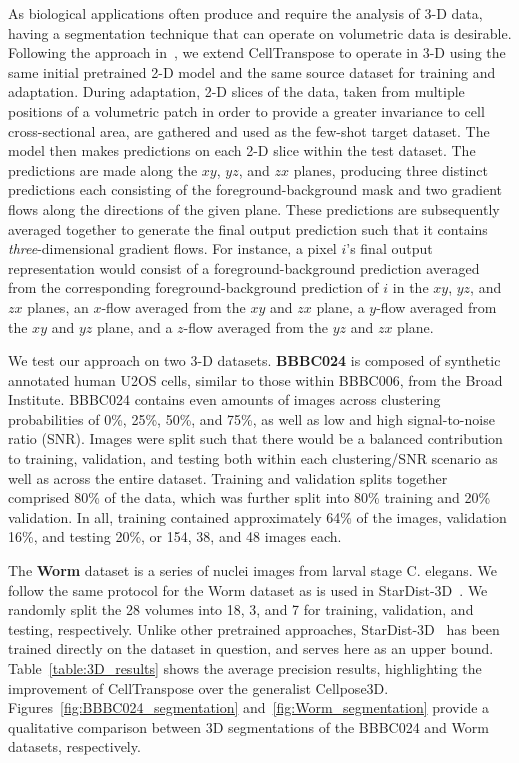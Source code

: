 As biological applications often produce and require the analysis of 3-D data, having a segmentation technique that can operate on volumetric data is desirable. Following the approach in~\cite{Stringer2021-yw}, we extend CellTranspose to operate in 3-D using the same initial pretrained 2-D model and the same source dataset for training and adaptation. During adaptation, 2-D slices of the data, taken from multiple positions of a volumetric patch in order to provide a greater invariance to cell cross-sectional area, are gathered and used as the few-shot target dataset. The model then makes predictions on each 2-D slice within the test dataset. The predictions are made along the $xy$, $yz$, and $zx$ planes, producing three distinct predictions each consisting of the foreground-background mask and two gradient flows along the directions of the given plane. These predictions are subsequently averaged together to generate the final output prediction such that it contains \emph{three}-dimensional gradient flows. For instance, a pixel $i$'s final output representation would consist of a foreground-background prediction averaged from the corresponding foreground-background prediction of $i$ in the $xy$, $yz$, and $zx$ planes, an $x$-flow averaged from the $xy$ and $zx$ plane, a $y$-flow averaged from the $xy$ and $yz$ plane, and a $z$-flow averaged from the $yz$ and $zx$ plane.

We test our approach on two 3-D datasets. \textbf{BBBC024} is composed of synthetic annotated human U2OS cells, similar to those within BBBC006, from the Broad Institute. BBBC024 contains even amounts of images across clustering probabilities of 0\%, 25\%, 50\%, and 75\%, as well as low and high signal-to-noise ratio (SNR). Images were split such that there would be a balanced contribution to training, validation, and testing both within each clustering/SNR scenario as well as across the entire dataset. Training and validation splits together comprised 80\% of the data, which was further split into 80\% training and 20\% validation. In all, training contained approximately 64\% of the images, validation 16\%, and testing 20\%, or 154, 38, and 48 images each.

The \textbf{Worm} dataset is a series of nuclei images from larval stage C. elegans. We follow the same protocol for the Worm dataset as is used in StarDist-3D~\cite{Weigert_2020_WACV}. We randomly split the 28 volumes into 18, 3, and 7 for training, validation, and testing, respectively.
Unlike other pretrained approaches, StarDist-3D~\cite{Weigert_2020_WACV} has been trained directly on the dataset in question, and serves here as an upper bound. Table~\ref{table:3D_results} shows the average precision results, highlighting the improvement of CellTranspose over the generalist Cellpose3D. Figures~\ref{fig:BBBC024_segmentation} and~\ref{fig:Worm_segmentation} provide a qualitative comparison between 3D segmentations of the BBBC024 and Worm datasets, respectively.


